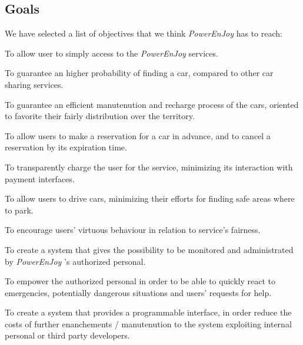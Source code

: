 \documentclass[english]{article}
\newcommand{\powerenjoy}{\textit{PowerEnJoy }}
\begin{document}
	\subsection{Goals}
	We have selected a list of objectives that we think \powerenjoy  has to reach:
	\begin{description}
		

		\item [G.1]{ To allow user to simply access to the \powerenjoy services. }
		\item [G.2]{ To guarantee an higher  probability of finding a car, compared to other car sharing services. }
		\item [G.3]{ To guarantee an efficient manutenution and recharge process of the cars, oriented to favorite their fairly distribution over the territory. }

		\item [G.4]{ To allow users to make a reservation for a car in advance, and to cancel a reservation by its expiration time. }
		\item [G.5]{  To transparently charge the user for the service, minimizing its interaction with payment interfaces. }
		\item [G.6]{  To allow users to drive cars, minimizing their efforts for finding safe areas where to park.}
		\item [G.7]{ To encourage users' virtuous behaviour  in relation to service's fairness. }

		\item [G.8]{ To create a system that gives the possibility to be monitored and administrated by \powerenjoy's authorized personal. }
		\item [G.9]{  To empower the authorized personal in order to be able to quickly react to emergencies, potentially dangerous situations and users' requests for help.}
		\item [G.10]{ To create a system that provides a programmable interface, in order reduce the costs of further enanchements / manutenution to the system exploiting internal personal or third party developers.}
	\end{description}
\end{document}
